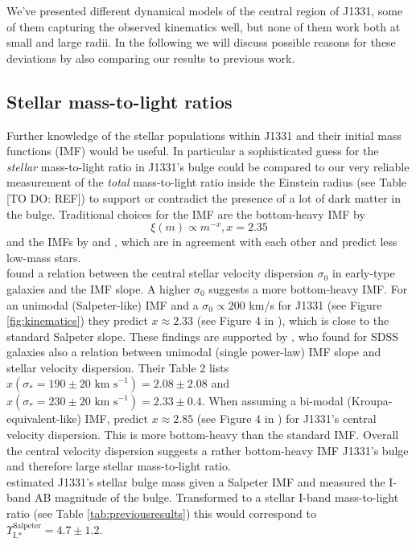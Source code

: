 We've presented different dynamical models of the central region of J1331, some of them capturing the observed kinematics well, but none of them work both at small and large radii. In the following we will discuss possible reasons for these deviations by also comparing our results to previous work.

\subsection{Stellar mass-to-light ratios}

Further knowledge of the stellar populations within J1331 and their initial mass functions (IMF) would be useful. In particular a sophisticated guess for the \emph{stellar} mass-to-light ratio in J1331's bulge could be compared to our very reliable measurement of the \emph{total} mass-to-light ratio inside the Einstein radius (see Table [TO DO: REF]) to support or contradict the presence of a lot of dark matter in the bulge. Traditional choices for the IMF are the bottom-heavy IMF by \citet{Salpeter1955}
$$\xi(m) \propto m^{-x}, x=2.35$$
and the IMFs by \citet{2002Sci...295...82K} and \citet{Chabrier2003}, which are in agreement with each other and predict less low-mass stars. \\\citet{Ferreras} found a relation between the central stellar velocity dispersion $\sigma_0$ in early-type galaxies and the IMF slope. A higher $\sigma_0$ suggests a more bottom-heavy IMF. For an unimodal (Salpeter-like) IMF and a $\sigma_0 \propto 200 $ km/s for J1331 (see Figure \ref{fig:kinematics}) they predict $x \approx 2.33$ (see Figure 4 in \citet{Ferreras}), which is close to the standard Salpeter slope. These findings are supported by \citet{2014MNRAS.438.1483S}, who found for SDSS galaxies also a relation between unimodal (single power-law) IMF slope and stellar velocity dispersion. Their Table 2 lists $x(\sigma_*=190 \pm 20 \text{ km s}^{-1}) = 2.08 \pm 2.08$ and $x(\sigma_*= 230 \pm 20 \text{ km s}^{-1}) = 2.33 \pm 0.4$. When assuming a bi-modal (Kroupa-equivalent-like) IMF, \citet{Ferreras} predict $x \approx 2.85$ (see Figure 4 in \citet{Ferreras}) for J1331's central velocity dispersion. This is more bottom-heavy than the standard \citet{2002Sci...295...82K} IMF. Overall the central velocity dispersion suggests a rather bottom-heavy IMF J1331's bulge and therefore large stellar mass-to-light ratio.
\\ \citet{SWELLSI} estimated J1331's stellar bulge mass given a Salpeter IMF and measured the I-band AB magnitude of the bulge. Transformed to a stellar I-band mass-to-light ratio (see Table \ref{tab:previousresults}) this would correspond to $\Upsilon_\text{I,*}^\text{Salpeter} = 4.7 \pm 1.2$.
